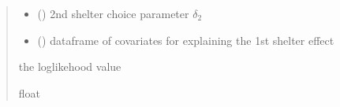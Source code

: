 \documentclass[letterpaper,10pt,english]{sphinxmanual}
\begin{document}
\begin{fulllineitems}
\begin{quote}
\begin{description}
\begin{itemize}
\item {} 
\sphinxAtStartPar
{} () \textendash{} 2nd shelter choice parameter \(\delta_2\)

\item {} 
\sphinxAtStartPar
{} () \textendash{} dataframe of covariates for explaining the 1st shelter effect

\end{itemize}

\sphinxAtStartPar
the log\sphinxhyphen{}likehood value

\sphinxAtStartPar
float

\end{description}\end{quote}

\end{fulllineitems}

\end{document}
